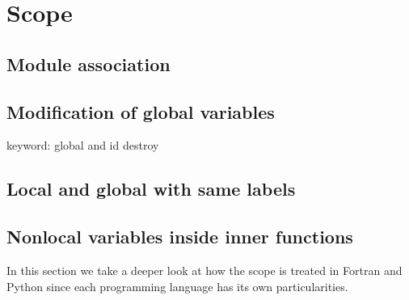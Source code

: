\chapter{Scope} 


\section{Module association}

\section{Modification of global variables}
keyword: global and id destroy 

\section{Local and global with same labels}

\section{Nonlocal variables inside inner functions} 



In this section we take a deeper look at how the scope is treated in Fortran and Python since each programming language has its own particularities. 

